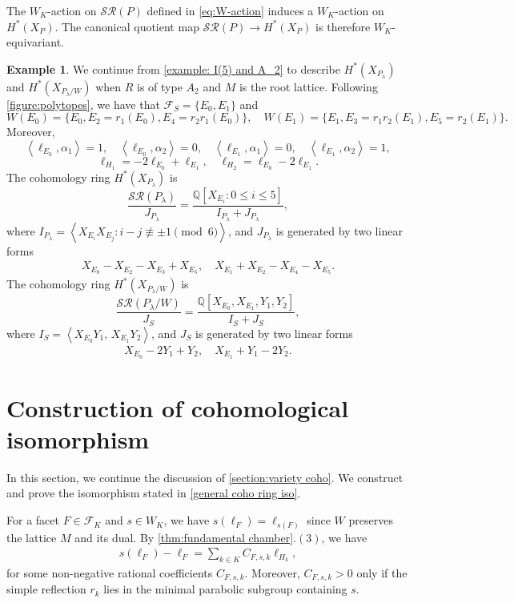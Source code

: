 \documentclass{amsart}
\theoremstyle{plain} \numberwithin{equation}{section}
\theoremstyle{definition}
\newtheorem{example}[theorem]{Example}
\newcommand{\Q}{\mathbb{Q}}
\newcommand{\ip}[1]{\left\langle #1 \right\rangle}
\begin{document}
The $W_K$-action on $\mathcal{SR}(P)$ defined in \cref{eq:W-action} induces a $W_K$-action on $H^*(X_P)$.
The canonical quotient map $\mathcal{SR}(P)\to H^*(X_P)$ is therefore $W_K$-equivariant.



\begin{example}\label{example: coho ring A_2}
  We continue from \cref{example: I(5) and A_2} to describe $H^*(X_{P_{\lambda}})$ and $H^*(X_{P_{\lambda}/W})$  when $R$ is of type $A_2$ and $M$ is the root lattice. Following \cref{figure:polytopes}, we have that $\mathcal{F}_S=\{E_0,E_1\}$ and
  $$W(E_0)=\{E_0,E_2=r_1(E_0),E_4=r_2r_1(E_0)\},\quad W(E_1)=\{E_1,E_3=r_1r_2(E_1),E_5=r_2(E_1)\}.$$
Moreover, 
  $$\ip{\ell_{E_0},\alpha_1}=1,\quad \ip{\ell_{E_0},\alpha_2}=0,\quad\ip{\ell_{E_1},\alpha_1}=0,\quad \ip{\ell_{E_1},\alpha_2}=1,$$
  $$\ell_{H_1}=-2\ell_{E_0}+\ell_{E_1},\quad \ell_{H_2}=\ell_{E_0}-2\ell_{E_1}.$$
  The cohomology ring $H^*(X_{P_\lambda})$ is 
  $$ \frac{\mathcal{SR}(P_\lambda)}{J_{P_\lambda}}=\frac{\Q[X_{E_{i}}: 0\leq i\leq 5]}{I_{P_\lambda}+J_{P_\lambda}},
  $$
  where $I_{P_\lambda}=\ip{X_{E_i}X_{E_j}:i-j\not\equiv \pm 1\pmod{6}}$, and $J_{P_\lambda}$ is generated by two linear forms
  \begin{align*}
    X_{E_0}-X_{E_2}-X_{E_3}+X_{E_5},\quad X_{E_1}+X_{E_2}-X_{E_4}-X_{E_5}.
  \end{align*}
 The cohomology ring $H^*(X_{P_{\lambda}/W})$ is 
  $$ \frac{\mathcal{SR}(P_{\lambda}/W)}{J_S}=\frac{\Q[X_{E_0}, X_{E_1},Y_1, Y_2]}{I_S+J_S},
  $$
  where $I_S=\ip{X_{E_0}Y_1,\, X_{E_1}Y_2}$, and $J_{S}$ is generated by two linear forms
  \begin{align*}
    X_{E_0}-2Y_1+Y_2,\quad X_{E_1}+Y_1-2Y_2.
  \end{align*}
\end{example}



\section{Construction of cohomological isomorphism}\label{section:proofs coho}
In this section, we continue the discussion of \cref{section:variety coho}. We construct and prove the isomorphism stated in \cref{general coho ring iso}.


For a facet $F\in\mathcal{F}_K$ and $s\in W_K$, we have $s(\ell_{F})=\ell_{s(F)}$ since $W$ preserves the lattice $M$ and its dual. 
By  \cref{thm:fundamental chamber}.$(3)$, we have
\begin{align}
  s(\ell_{F})-\ell_{F}=\sum_{k\in K} C_{F,s,k}\ell_{H_k},\label{eq:coefficients of s}
\end{align}
 for some non-negative rational coefficients $C_{F,s,k}$. Moreover, $C_{F,s,k}>0$ only if the simple reflection $r_k$ lies in the minimal parabolic subgroup containing $s$.
\end{document}
